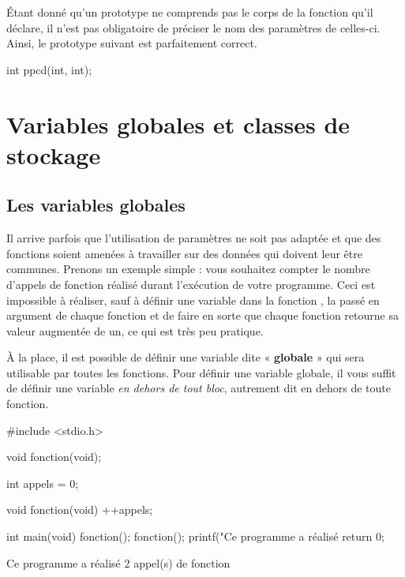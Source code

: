 \begin{infobox}
  Étant donné qu'un prototype ne
comprends pas le corps de la fonction qu'il déclare, il n'est pas
obligatoire de préciser le nom des paramètres de celles-ci. Ainsi, le
prototype suivant est parfaitement correct. 
\begin{C}
int ppcd(int, int);
\end{C}
\end{infobox}

\section{Variables globales et classes de stockage}
\label{variables-globales-et-classes-de-stockage}


\subsection{Les variables globales}
\label{les-variables-globales}

Il arrive parfois que l'utilisation de paramètres ne soit pas adaptée et
que des fonctions soient amenées à travailler sur des données qui
doivent leur être communes. Prenons un exemple simple : vous souhaitez
compter le nombre d'appels de fonction réalisé durant l'exécution de
votre programme. Ceci est impossible à réaliser, sauf à définir une
variable dans la fonction , la passé en argument de
chaque fonction et de faire en sorte que chaque fonction retourne sa
valeur augmentée de un, ce qui est très peu pratique.

À la place, il est possible de définir une variable dite «
\textbf{globale} » qui sera utilisable par toutes les fonctions. Pour
définir une variable globale, il vous suffit de définir une variable
\emph{en dehors de tout bloc}, autrement dit en dehors de toute
fonction.

\begin{C}
#include <stdio.h>

void fonction(void);

int appels = 0;


void fonction(void)
{
    ++appels;
}


int main(void)
{
    fonction();
    fonction();
    printf("Ce programme a réalisé %
    return 0;
}

\end{C}

\begin{C}
Ce programme a réalisé 2 appel(s) de fonction
\end{C}

